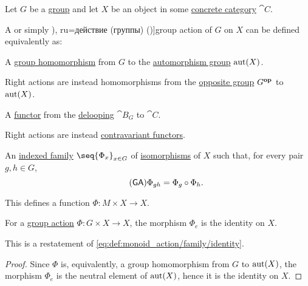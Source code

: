 \begin{definition}\label{def:group_action}
  Let \( G \) be a \hyperref[def:group]{group} and let \( X \) be an object in some \hyperref[def:concrete_category]{concrete category} \( \cat{C} \).

  A  or simply \term[bg=действие (на група) (\cite[def. IV.18]{ГеновМиховскиМоллов1991Алгебра}), ru=действие (группы) (\cite[def. 10.3.1]{Винберг2014Алгебра})]{group action} of \( G \) on \( X \) can be defined equivalently as:
  \begin{thmenum}
     A \hyperref[def:group/homomorphism]{group homomorphism} from \( G \) to the \hyperref[def:automorphism_group]{automorphism group} \( \operatorname{aut}(X) \).

    Right actions are instead homomorphisms from the \hyperref[def:group/opposite]{opposite group} \( G^\oppos \) to \( \operatorname{aut}(X) \).

     A \hyperref[def:functor]{functor} from the \hyperref[def:monoid_delooping]{delooping} \( \cat{B}_G \) to \( \cat{C} \).

    Right actions are instead \hyperref[rem:contravariant_functor]{contravariant functors}.

     An \hyperref[def:cartesian_product/indexed_family]{indexed family} \( \seq{ \Phi_x }_{x \in G} \) of \hyperref[def:morphism_invertibility/isomorphism]{isomorphisms} of \( X \) such that, for every pair \( g, h \in G \),
    \begin{equation}\label{eq:def:group_action/family/compatibility}\tag{\logic{GA}}
      \Phi_{gh} = \Phi_g \bincirc \Phi_h.
    \end{equation}

    This defines a function \( \Phi: M \times X \to X \).
  \end{thmenum}
\end{definition}

\begin{proposition}\label{thm:group_action_of_neutral_element}
  For a \hyperref[def:group_action]{group action} \( \Phi: G \times X \to X \), the morphism \( \Phi_e \) is the identity on \( X \).
\end{proposition}
\begin{comments}
  \item This is a restatement of \eqref{eq:def:monoid_action/family/identity}.
\end{comments}
\begin{proof}
  Since \( \Phi \) is, equivalently, a group homomorphism from \( G \) to \( \operatorname{aut}(X) \), the morphism \( \Phi_e \) is the neutral element of \( \operatorname{aut}(X) \), hence it is the identity on \( X \).
\end{proof}

